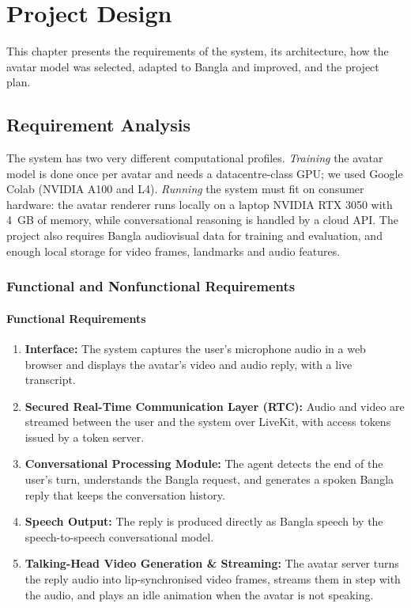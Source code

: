 \chapter{Project Design}

This chapter presents the requirements of the system, its architecture, how the avatar model was selected, adapted to Bangla and improved, and the project plan.

\section{Requirement Analysis}
The system has two very different computational profiles. \textit{Training} the avatar model is done once per avatar and needs a datacentre-class GPU; we used Google Colab (NVIDIA A100 and L4). \textit{Running} the system must fit on consumer hardware: the avatar renderer runs locally on a laptop NVIDIA RTX 3050 with 4~GB of memory, while conversational reasoning is handled by a cloud API. The project also requires Bangla audiovisual data for training and evaluation, and enough local storage for video frames, landmarks and audio features.


\subsection{Functional and Nonfunctional Requirements}

\subsubsection{Functional Requirements}

\begin{enumerate}
    \item \textbf{Interface:} The system captures the user's microphone audio in a web browser and displays the avatar's video and audio reply, with a live transcript.

    \item \textbf{Secured Real-Time Communication Layer (RTC):} Audio and video are streamed between the user and the system over LiveKit, with access tokens issued by a token server.

    \item \textbf{Conversational Processing Module:} The agent detects the end of the user's turn, understands the Bangla request, and generates a spoken Bangla reply that keeps the conversation history.

    \item \textbf{Speech Output:} The reply is produced directly as Bangla speech by the speech-to-speech conversational model.

    \item \textbf{Talking-Head Video Generation \& Streaming:} The avatar server turns the reply audio into lip-synchronised video frames, streams them in step with the audio, and plays an idle animation when the avatar is not speaking.
\end{enumerate}


